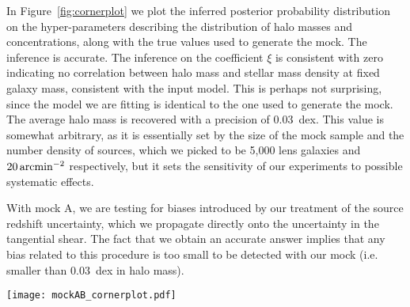 \documentclass[usenatbib]{mnras}
\def\Fref#1{Figure~\ref{#1}\xspace}
\begin{document}
In \Fref{fig:cornerplot} we plot the inferred posterior probability distribution on the hyper-parameters describing the distribution of halo masses and concentrations, along with the true values used to generate the mock.
The inference is accurate. The inference on the coefficient $\xi$ is consistent with zero indicating no correlation between halo mass and stellar mass density at fixed galaxy mass, consistent with the input model. This is perhaps not surprising, since the model we are fitting is identical to the one used to generate the mock. The average halo mass is recovered with a precision of $0.03$~dex.
This value is somewhat arbitrary, as it is essentially set by the size of the mock sample and the number density of sources, which we picked to be 5,000 lens galaxies and $20\,\rm{arcmin}^{-2}$ respectively, but it sets the sensitivity of our experiments to possible systematic effects.

With mock A, we are testing for biases introduced by our treatment of the source redshift uncertainty, which we propagate directly onto the uncertainty in the tangential shear. The fact that we obtain an accurate answer implies that any bias related to this procedure is too small to be detected with our mock (i.e. smaller than $0.03$~dex in halo mass).

%
\begin{figure*}
 \texttt{[image: mockAB\_cornerplot.pdf]}
 \caption{Posterior probability distribution for the hyper-parameters describing the distribution in halo mass and halo concentration, obtained from fits of different models to sets of mock observations A and B. Blue contours show the inference obtained by fitting the model to mock A. Black Solid lines correspond to the inference made on mock A by fitting a model that ignores the contribution of the stars to the lensing signal. Red contours correspond to the inference made by fitting the model to mock B, which differs from mock A by the presence of miscentering between galaxies and halos.
Contours delimit 68\%, 95\% and 99.7\% enclosed probability regions.
Black dots and dotted lines show the true values of the hyper-parameters used to create the mocks.}
 \label{fig:cornerplot}
\end{figure*}
%
\end{document}
